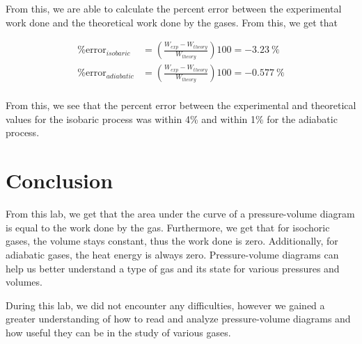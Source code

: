 \documentclass[12pt]{article}
\begin{document}
From this, we are able to calculate the percent error between the experimental work done and the theoretical work done by the gases. From this, we get that

\begin{equation*}
    \begin{split}
        \text{\% error}_{isobaric} &= \left( \frac{W_{exp} - W_{theory}}{W_{theory}} \right) 100 = \SI{-3.23}{\percent} \\
        \text{\% error}_{adiabatic} &= \left( \frac{W_{exp} - W_{theory}}{W_{theory}} \right) 100 = \SI{-0.577}{\percent} \\
    \end{split}
\end{equation*}

From this, we see that the percent error between the experimental and theoretical values for the isobaric process was within 4\% and within 1\% for the adiabatic process.

\section{Conclusion}
From this lab, we get that the area under the curve of a pressure-volume diagram is equal to the work done by the gas. Furthermore, we get that for isochoric gases, the volume stays constant, thus the work done is zero. Additionally, for adiabatic gases, the heat energy is always zero. Pressure-volume diagrams can help us better understand a type of gas and its state for various pressures and volumes.

During this lab, we did not encounter any difficulties, however we gained a greater understanding of how to read and analyze pressure-volume diagrams and how useful they can be in the study of various gases.
\end{document}
